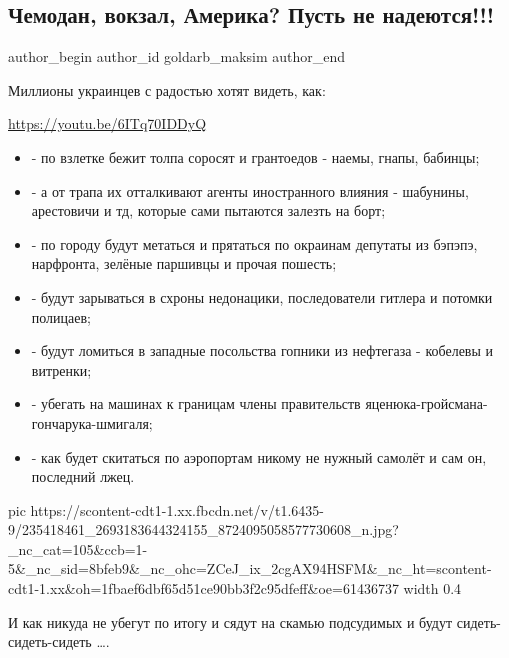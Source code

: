  
 
 
 
 
 
\subsection{Чемодан, вокзал, Америка? Пусть не надеются!!!}
\label{sec:17_08_2021.fb.goldarb_maksim.1.chemodan_vokzal_amerika}
 
\ifcmt
 author_begin
   author_id goldarb_maksim
 author_end
\fi

Миллионы украинцев с радостью хотят видеть, как:

\url{https://youtu.be/6ITq70IDDyQ}

\begin{itemize}
  \item - по взлетке бежит толпа соросят и грантоедов - наемы, гнапы, бабинцы;
  \item - а от трапа их отталкивают агенты иностранного влияния - шабунины, арестовичи и тд, которые сами пытаются залезть на борт; 
  \item - по городу будут метаться и прятаться по окраинам депутаты из бэпэпэ, нарфронта, зелёные паршивцы и прочая пошесть;
  \item - будут зарываться в схроны недонацики, последователи гитлера и потомки полицаев;
  \item - будут ломиться в западные посольства гопники из нефтегаза - кобелевы и витренки;
  \item - убегать на машинах к границам члены правительств яценюка-гройсмана-гончарука-шмигаля;
  \item - как будет скитаться по аэропортам никому не нужный самолёт и сам он, последний лжец. 
\end{itemize}

\ifcmt
  pic https://scontent-cdt1-1.xx.fbcdn.net/v/t1.6435-9/235418461_2693183644324155_8724095058577730608_n.jpg?_nc_cat=105&ccb=1-5&_nc_sid=8bfeb9&_nc_ohc=ZCeJ_ix_2cgAX94HSFM&_nc_ht=scontent-cdt1-1.xx&oh=1fbaef6dbf65d51ce90bb3f2c95dfeff&oe=61436737
  width 0.4
\fi

И как никуда не убегут по итогу и сядут на скамью подсудимых и будут
сидеть-сидеть-сидеть ….

